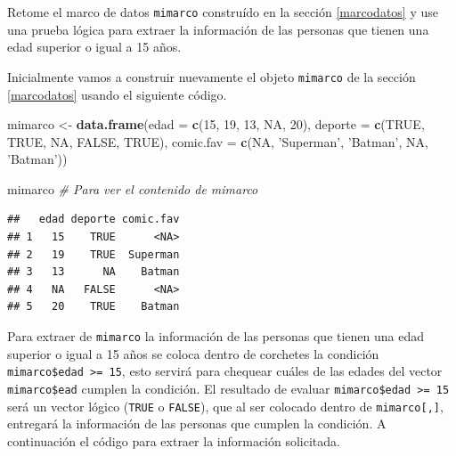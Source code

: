 \documentclass[10pt,]{krantz}
\makeatletter
\newenvironment{Shaded}{\begin{snugshade}}{\end{snugshade}}
\newcommand{\KeywordTok}[1]{\textcolor[rgb]{0.13,0.29,0.53}{\textbf{#1}}}
\newcommand{\DataTypeTok}[1]{\textcolor[rgb]{0.13,0.29,0.53}{#1}}
\newcommand{\DecValTok}[1]{\textcolor[rgb]{0.00,0.00,0.81}{#1}}
\newcommand{\StringTok}[1]{\textcolor[rgb]{0.31,0.60,0.02}{#1}}
\newcommand{\CommentTok}[1]{\textcolor[rgb]{0.56,0.35,0.01}{\textit{#1}}}
\newcommand{\OtherTok}[1]{\textcolor[rgb]{0.56,0.35,0.01}{#1}}
\newcommand{\OperatorTok}[1]{\textcolor[rgb]{0.81,0.36,0.00}{\textbf{#1}}}
\newcommand{\NormalTok}[1]{#1}
\newenvironment{kframe}{%
\medskip{}
\setlength{\fboxsep}{.8em}
 \def\at@end@of@kframe{}%
 \ifinner\ifhmode%
  \def\at@end@of@kframe{\end{minipage}}%
  \begin{minipage}{\columnwidth}%
 \fi\fi%
 \def\FrameCommand##1{\hskip\@totalleftmargin \hskip-\fboxsep
 \colorbox{shadecolor}{##1}\hskip-\fboxsep
     \hskip-\linewidth \hskip-\@totalleftmargin \hskip\columnwidth}%
 \MakeFramed {\advance\hsize-\width
   \@totalleftmargin\z@ \linewidth\hsize
   \@setminipage}}%
 {\par\unskip\endMakeFramed%
 \at@end@of@kframe}
\renewenvironment{Shaded}{\begin{kframe}}{\end{kframe}}
\makeatother
\begin{document}
Retome el marco de datos \texttt{mimarco} construído en la sección
\ref{marcodatos} y use una prueba lógica para extraer la información de
las personas que tienen una edad superior o igual a 15 años.

Inicialmente vamos a construir nuevamente el objeto \texttt{mimarco} de
la sección \ref{marcodatos} usando el siguiente código.

\begin{Shaded}
\begin{Highlighting}[]
\NormalTok{mimarco <-}\StringTok{ }\KeywordTok{data.frame}\NormalTok{(}\DataTypeTok{edad =} \KeywordTok{c}\NormalTok{(}\DecValTok{15}\NormalTok{, }\DecValTok{19}\NormalTok{, }\DecValTok{13}\NormalTok{, }\OtherTok{NA}\NormalTok{, }\DecValTok{20}\NormalTok{), }
                      \DataTypeTok{deporte =} \KeywordTok{c}\NormalTok{(}\OtherTok{TRUE}\NormalTok{, }\OtherTok{TRUE}\NormalTok{, }\OtherTok{NA}\NormalTok{, }\OtherTok{FALSE}\NormalTok{, }\OtherTok{TRUE}\NormalTok{),}
                      \DataTypeTok{comic.fav =} \KeywordTok{c}\NormalTok{(}\OtherTok{NA}\NormalTok{, }\StringTok{'Superman'}\NormalTok{, }\StringTok{'Batman'}\NormalTok{,}
                                    \OtherTok{NA}\NormalTok{, }\StringTok{'Batman'}\NormalTok{))}

\NormalTok{mimarco  }\CommentTok{# Para ver el contenido de mimarco}
\end{Highlighting}
\end{Shaded}

\begin{verbatim}
##   edad deporte comic.fav
## 1   15    TRUE      <NA>
## 2   19    TRUE  Superman
## 3   13      NA    Batman
## 4   NA   FALSE      <NA>
## 5   20    TRUE    Batman
\end{verbatim}

Para extraer de \texttt{mimarco} la información de las personas que
tienen una edad superior o igual a 15 años se coloca dentro de corchetes
la condición \texttt{mimarco\$edad\ \textgreater{}=\ 15}, esto servirá
para chequear cuáles de las edades del vector \texttt{mimarco\$ead}
cumplen la condición. El resultado de evaluar
\texttt{mimarco\$edad\ \textgreater{}=\ 15} será un vector lógico
(\texttt{TRUE} o \texttt{FALSE}), que al ser colocado dentro de
\texttt{mimarco{[},{]}}, entregará la información de las personas que
cumplen la condición. A continuación el código para extraer la
información solicitada.

\begin{Shaded}
\end{Shaded}
\end{document}
